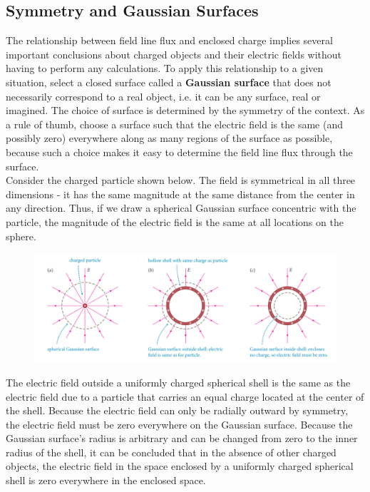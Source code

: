     \subsection{Symmetry and Gaussian Surfaces} %

        The relationship between field line flux and enclosed charge implies several important conclusions about charged objects and their electric fields without having to perform any calculations. To apply this
        relationship to a given situation, select a closed surface called a \textbf{Gaussian surface} that does not necessarily correspond to a real object, i.e. it can be any surface, real or imagined. The choice
        of surface is determined by the symmetry of the context. As a rule of thumb, choose a surface such that the electric field is the same (and possibly zero) everywhere along as many regions of the surface as
        possible, because such a choice makes it easy to determine the field line flux through the surface. \\

        Consider the charged particle shown below. The field is symmetrical in all three dimensions - it has the same magnitude at the same distance from the center in any direction. Thus, if we draw a spherical
        Gaussian surface concentric with the particle, the magnitude of the electric field is the same at all locations on the sphere.

        \begin{figure}[hbt!]
            \centering
            \includegraphics[scale = 0.75]{Resources/24.4_Gaussian_Surface}
        \end{figure}

        The electric field outside a uniformly charged spherical shell is the same as the electric field due to a particle that carries an equal charge located at the center of the shell. Because the electric field
        can only be radially outward by symmetry, the electric field must be zero everywhere on the Gaussian surface. Because the Gaussian surface's radius is arbitrary and can be changed from zero to the inner radius
        of the shell, it can be concluded that in the absence of other charged objects, the electric field in the space enclosed by a uniformly charged spherical shell is zero everywhere in the enclosed space. \\

